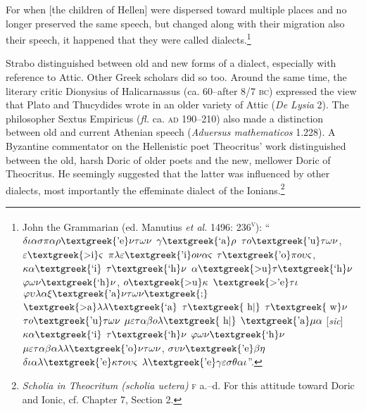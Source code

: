 \documentclass[12pt]{article}
\newenvironment{styleStandard}{\renewcommand\baselinestretch{1.25}\setlength\leftskip{0in}\setlength\rightskip{0in}\setlength\parindent{0.1972in}\setlength\parfillskip{0pt plus 1fil}\setlength\parskip{0in plus 1pt}\writerlistparindent\writerlistleftskip\leavevmode\normalfont\normalsize\writerlistlabel\ignorespaces}{\unskip\vspace{0in plus 1pt}\par}
\newenvironment{styleQuote}{\renewcommand\baselinestretch{1.25}\setlength\leftskip{0.3937in}\setlength\rightskip{0in}\setlength\parindent{0in}\setlength\parfillskip{0pt plus 1fil}\setlength\parskip{0.1665in plus 0.016649999in}\writerlistparindent\writerlistleftskip\leavevmode\normalfont\normalsize\writerlistlabel\ignorespaces}{\unskip\vspace{0.1665in plus 0.016649999in}\par}
\newcommand\writerlistleftskip{}
\newcommand\writerlistparindent{}
\newcommand\writerlistlabel{}
\begin{document}
\begin{styleQuote}
For when [the children of Hellen] were dispersed toward multiple places and no longer preserved the same speech, but changed along with their migration also their speech, it happened that they were called dialects.\footnote{ John the Grammarian (ed. Manutius \textit{et al.} 1496: 236\textsc{\textsuperscript{v}}): “$\delta \iota \alpha \sigma \pi \alpha \rho \text{\textgreek{'e}}\nu \tau \omega \nu $ $\gamma \text{\textgreek{`a}}\rho $ $\tau o\text{\textgreek{'u}}\tau \omega \nu $, $\varepsilon \text{\textgreek{>i}}\varsigma $ $\pi \lambda \varepsilon \text{\textgreek{'i}}o\nu \alpha \varsigma $ $\tau \text{\textgreek{'o}}\pi o\upsilon \varsigma $, $\kappa \alpha \text{\textgreek{`i}}$ $\tau \text{\textgreek{`h}}\nu $ $\alpha \text{\textgreek{>u}}\tau \text{\textgreek{`h}}\nu $ $\varphi \omega \nu \text{\textgreek{`h}}\nu $, $o\text{\textgreek{>u}}\kappa $ $\text{\textgreek{>'e}}\tau \iota $ $\varphi \upsilon \lambda \alpha \xi \text{\textgreek{'a}}\nu \tau \omega \nu \text{\textgreek{;}}$ $\text{\textgreek{>a}}\lambda \lambda \text{\textgreek{`a}}$ $\tau \text{\textgreek{~h|}}$ $\tau \text{\textgreek{~w}}\nu $ $\tau o\text{\textgreek{'u}}\tau \omega \nu $ $\mu \varepsilon \tau \alpha \beta o\lambda \text{\textgreek{~h|}}$ $\text{\textgreek{'a}}\mu \alpha $ [\textit{sic}] $\kappa \alpha \text{\textgreek{`i}}$ $\tau \text{\textgreek{`h}}\nu $ $\varphi \omega \nu \text{\textgreek{`h}}\nu $ $\mu \varepsilon \tau \alpha \beta \alpha \lambda \lambda \text{\textgreek{'o}}\nu \tau \omega \nu $, $\sigma \upsilon \nu \text{\textgreek{'e}}\beta \eta $ $\delta \iota \alpha \lambda \text{\textgreek{'e}}\kappa \tau o\upsilon \varsigma $ $\lambda \text{\textgreek{'e}}\gamma \varepsilon \sigma \theta \alpha \iota $”.}
\end{styleQuote}

\begin{styleStandard}
Strabo distinguished between old and new forms of a dialect, especially with reference to Attic. Other Greek scholars did so too. Around the same time, the literary critic Dionysius of Halicarnassus (ca. 60–after 8/7 \textsc{bc}) expressed the view that Plato and Thucydides wrote in an older variety of Attic (\textit{De Lysia} 2). The philosopher Sextus Empiricus (\textit{fl.} ca. \textsc{ad} 190–210) also made a distinction between old and current Athenian speech (\textit{Aduersus mathematicos} 1.228). A Byzantine commentator on the Hellenistic poet Theocritus’ work distinguished between the old, harsh Doric of older poets and the new, mellower Doric of Theocritus. He seemingly suggested that the latter was influenced by other dialects, most importantly the effeminate dialect of the Ionians.\footnote{ \textit{Scholia in Theocritum (scholia uetera)} \textsc{f }a.–d. For this attitude toward Doric and Ionic, cf. Chapter 7, Section 2.}
\end{styleStandard}
\end{document}
